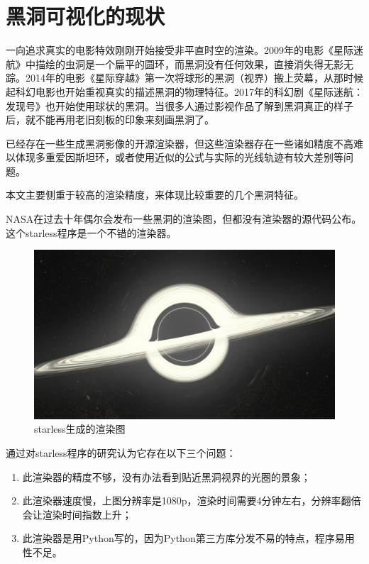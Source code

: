 \section{黑洞可视化的现状}
一向追求真实的电影特效刚刚开始接受非平直时空的渲染。2009年的电影《星际迷航》中描绘的虫洞是一个扁平的圆环，而黑洞没有任何效果，直接消失得无影无踪。2014年的电影《星际穿越》第一次将球形的黑洞（视界）搬上荧幕，从那时候起科幻电影也开始重视真实的描述黑洞的物理特征。2017年的科幻剧《星际迷航：发现号》也开始使用球状的黑洞。当很多人通过影视作品了解到黑洞真正的样子后，就不能再用老旧刻板的印象来刻画黑洞了。

已经存在一些生成黑洞影像的开源渲染器，但这些渲染器存在一些诸如精度不高难以体现多重爱因斯坦环，或者使用近似的公式与实际的光线轨迹有较大差别等问题。

本文主要侧重于较高的渲染精度，来体现比较重要的几个黑洞特征。

NASA在过去十年偶尔会发布一些黑洞的渲染图\cite{nasa_2019_blackhole_visualization}\cite{raytraceusingstarcatalogue}，但都没有渲染器的源代码公布。这个starless程序\cite{starless}是一个不错的渲染器。

\begin{figure}[htbp]
    \centering
    \includegraphics[scale=0.2]{images/starless_hd.jpg}
    \caption{starless生成的渲染图}\label{fig:starless_hd} %
\end{figure}
通过对starless程序的研究认为它存在以下三个问题：
\begin{enumerate}
    \item 此渲染器的精度不够，没有办法看到贴近黑洞视界的光圈的景象；
    \item 此渲染器速度慢，上图分辨率是1080p，渲染时间需要4分钟左右，分辨率翻倍会让渲染时间指数上升；
    \item 此渲染器是用Python写的，因为Python第三方库分发不易的特点，程序易用性不足。
\end{enumerate}


